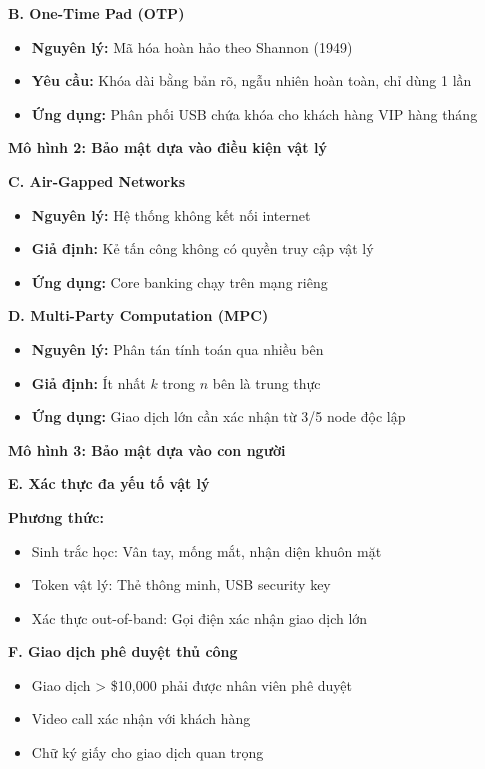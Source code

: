 \textbf{B. One-Time Pad (OTP)}
\begin{itemize}
    \item \textbf{Nguyên lý:} Mã hóa hoàn hảo theo Shannon (1949)
    \item \textbf{Yêu cầu:} Khóa dài bằng bản rõ, ngẫu nhiên hoàn toàn, chỉ dùng 1 lần
    \item \textbf{Ứng dụng:} Phân phối USB chứa khóa cho khách hàng VIP hàng tháng
\end{itemize}

\textbf{Mô hình 2: Bảo mật dựa vào điều kiện vật lý}

\textbf{C. Air-Gapped Networks}
\begin{itemize}
    \item \textbf{Nguyên lý:} Hệ thống không kết nối internet
    \item \textbf{Giả định:} Kẻ tấn công không có quyền truy cập vật lý
    \item \textbf{Ứng dụng:} Core banking chạy trên mạng riêng
\end{itemize}

\textbf{D. Multi-Party Computation (MPC)}
\begin{itemize}
    \item \textbf{Nguyên lý:} Phân tán tính toán qua nhiều bên
    \item \textbf{Giả định:} Ít nhất $k$ trong $n$ bên là trung thực
    \item \textbf{Ứng dụng:} Giao dịch lớn cần xác nhận từ 3/5 node độc lập
\end{itemize}

\textbf{Mô hình 3: Bảo mật dựa vào con người}

\textbf{E. Xác thực đa yếu tố vật lý}

\textbf{Phương thức:}
\begin{itemize}
    \item Sinh trắc học: Vân tay, mống mắt, nhận diện khuôn mặt
    \item Token vật lý: Thẻ thông minh, USB security key
    \item Xác thực out-of-band: Gọi điện xác nhận giao dịch lớn
\end{itemize}

\textbf{F. Giao dịch phê duyệt thủ công}
\begin{itemize}
    \item Giao dịch > \$10,000 phải được nhân viên phê duyệt
    \item Video call xác nhận với khách hàng
    \item Chữ ký giấy cho giao dịch quan trọng
\end{itemize}

